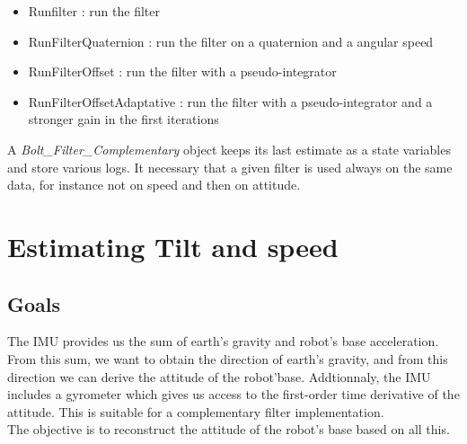\documentclass[a4paper,10pt]{article}
\begin{document}
\begin{itemize}
	\item Runfilter : run the filter
	\item RunFilterQuaternion : run the filter on a quaternion and a angular speed
	\item RunFilterOffset : run the filter with a pseudo-integrator
	\item RunFilterOffsetAdaptative : run the filter with a pseudo-integrator and a stronger gain in the first iterations
\end{itemize}

A \textit{Bolt\_Filter\_Complementary} object keeps its last estimate as a state variables and store various logs. It necessary that a given filter is used always on the same data, for instance not on speed and then on attitude. 


\section{Estimating Tilt and speed}
\label{estimating tilt and speed}

\subsection{Goals}
The IMU provides us the sum of earth's gravity and robot's base acceleration. From this sum, we want to obtain the direction of earth's gravity, and from this direction we can derive the attitude of the robot'base. Addtionnaly, the IMU includes a gyrometer which gives us access to the first-order time derivative of the attitude. This is suitable for a complementary filter implementation.\\
The objective is to reconstruct the attitude of the robot's base based on all this. 
\end{document}
